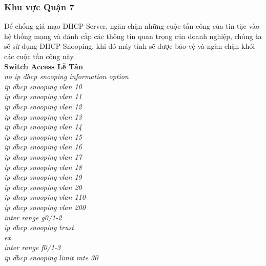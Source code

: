 \documentclass[a4paper, 12pt]{article}
\begin{document}
\subsubsection{Khu vực Quận 7}
\hspace*{0.25cm}Để chống giả mạo DHCP Server, ngăn chặn những cuộc tấn công của tin tặc vào hệ thống mạng và đánh cắp các thông tin quan trọng của doanh nghiệp, chúng ta sẽ sử dụng DHCP Snooping, khi đó máy tính sẽ được bảo vệ và ngăn chặn khỏi các cuộc tấn công này.\\
\hspace*{1cm}\textbf{Switch Access Lễ Tân}\\
\hspace*{2cm}\textit{no ip dhcp snooping information option\\
\hspace*{2cm}ip dhcp snooping vlan 10\\
\hspace*{2cm}ip dhcp snooping vlan 11\\
\hspace*{2cm}ip dhcp snooping vlan 12\\
\hspace*{2cm}ip dhcp snooping vlan 13\\
\hspace*{2cm}ip dhcp snooping vlan 14\\
\hspace*{2cm}ip dhcp snooping vlan 15\\
\hspace*{2cm}ip dhcp snooping vlan 16\\
\hspace*{2cm}ip dhcp snooping vlan 17\\
\hspace*{2cm}ip dhcp snooping vlan 18\\
\hspace*{2cm}ip dhcp snooping vlan 19\\
\hspace*{2cm}ip dhcp snooping vlan 20\\
\hspace*{2cm}ip dhcp snooping vlan 110\\
\hspace*{2cm}ip dhcp snooping vlan 200\\
\hspace*{2cm}inter range g0/1-2\\
\hspace*{2cm}ip dhcp snooping trust\\
\hspace*{2cm}ex\\
\hspace*{2cm}inter range f0/1-3\\
\hspace*{2cm}ip dhcp snooping limit rate 30\\}
\end{document}
